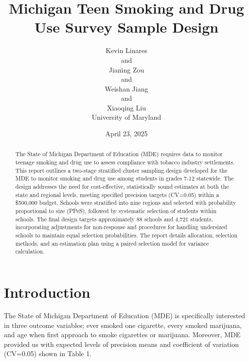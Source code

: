 \documentclass[
  12pt]{article}
\begin{document}
\def\spacingset#1{\renewcommand{\baselinestretch}%
{#1}\small\normalsize} \spacingset{1}



\date{April 23, 2025}
\title{\bf Michigan Teen Smoking and Drug Use Survey Sample Design}
\author{
Kevin Linares\\
and\\Jianing Zou\\
and\\Weishan Jiang\\
and\\Xiaoqing Liu\\
University of Maryland\\
}
\maketitle

\bigskip
\bigskip
\begin{abstract}
The State of Michigan Department of Education (MDE) requires data to
monitor teenage smoking and drug use to assess compliance with tobacco
industry settlements. This report outlines a two-stage stratified
cluster sampling design developed for the MDE to monitor smoking and
drug use among students in grades 7-12 statewide. The design addresses
the need for cost-effective, statistically sound estimates at both the
state and regional levels, meeting specified precision targets (CV=0.05)
within a \$500,000 budget. Schools were stratified into nine regions and
selected with probability proportional to size (PPeS), followed by
systematic selection of students within schools. The final design
targets approximately 88 schools and 4,721 students, incorporating
adjustments for non-response and procedures for handling undersized
schools to maintain equal selection probabilities. The report details
allocation, selection methods, and an estimation plan using a paired
selection model for variance calculation.
\end{abstract}


\newpage
\spacingset{1.9} %


\section{Introduction}\label{sec-intro}

The State of Michigan Department of Education (MDE) is specifically
interested in three outcome variables; ever smoked one cigarette, every
smoked marijuana, and age when first approach to smoke cigarettes or
marijuana. Moreover, MDE provided us with expected levels of precision
means and coefficient of variation (CV=0.05) shown in Table 1.
\end{document}
